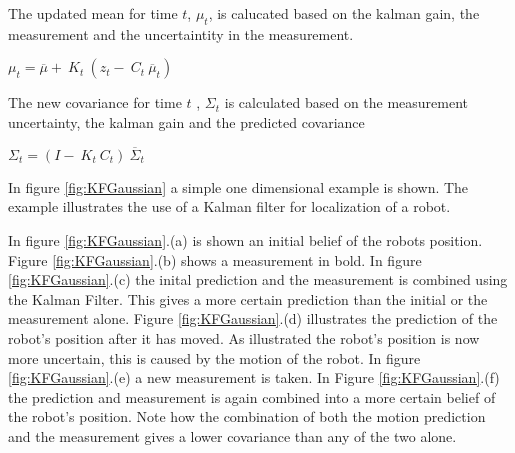 The updated mean for time $t$, $\mu_t$, is calucated based on the kalman gain, the measurement and the uncertaintity in the measurement.

\begin{center}
	$\mu_t =  \overline{\mu} + \ K_t \ (z_t- \ C_t \ \overline{\mu}_t)$ \\
\end{center}

The new covariance for time $t$ , $\Sigma_t$ is calculated based on the measurement uncertainty, the kalman gain and the predicted covariance
\begin{center}
$\Sigma_t = (I - \ K_t \ C_t) \ \overline{\Sigma}_t$ \\
\end{center}


In figure \ref{fig:KFGaussian} a simple one dimensional example is shown. The example illustrates the use of a Kalman filter for localization of a robot. 

In figure \ref{fig:KFGaussian}.(a) is shown an initial belief of the robots position. Figure \ref{fig:KFGaussian}.(b) shows a measurement in bold. In figure \ref{fig:KFGaussian}.(c) the inital prediction and the measurement is combined using the Kalman Filter. This gives a more certain prediction than the initial or the measurement alone. Figure \ref{fig:KFGaussian}.(d) illustrates the prediction of the robot's position after it has moved. As illustrated the robot's position is now more uncertain, this is caused by the motion of the robot. In figure \ref{fig:KFGaussian}.(e) a new measurement is taken. In Figure \ref{fig:KFGaussian}.(f) the prediction and measurement is again combined into a more certain belief of the robot's position. Note how the combination of both the motion prediction and the measurement gives a lower covariance than any of the two alone. 

